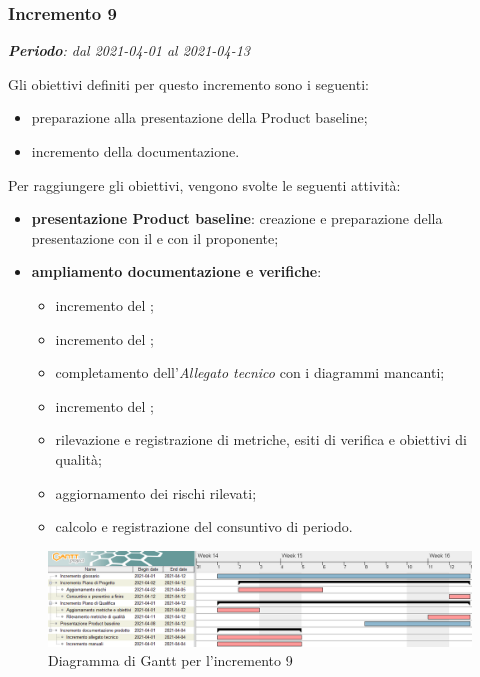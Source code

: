 \subsubsection{Incremento 9}
\textit{\textbf{Periodo}: dal 2021-04-01 al 2021-04-13}

Gli obiettivi definiti per questo incremento sono i seguenti:
\begin{itemize}
\item preparazione alla presentazione della Product baseline;
\item incremento della documentazione.
\end{itemize}

Per raggiungere gli obiettivi, vengono svolte le seguenti attività:
\begin{itemize}
\item \textbf{presentazione Product baseline}: creazione e preparazione della presentazione con il \CR{} e con il proponente;
\item \textbf{ampliamento documentazione e verifiche}:
\begin{itemize}
\item incremento del \MU{};
\item incremento del \MM{};
\item completamento dell'\textit{Allegato tecnico} con i diagrammi mancanti;
\item incremento del ;
\item rilevazione e registrazione di metriche, esiti di verifica e obiettivi di qualità;
\item aggiornamento dei rischi rilevati;
\item calcolo e registrazione del consuntivo di periodo.
\end{itemize}

\end{itemize}
\begin{figure}[H]
\centering

\centerline{\includegraphics[scale=0.5]{res/Pianificazione/Fasi/CodificaIncrementi/ganttIncremento9}}
\caption{Diagramma di Gantt per l'incremento 9}
\end{figure}